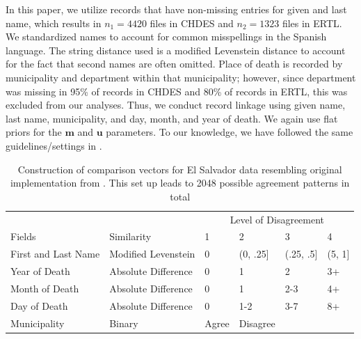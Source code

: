 \documentclass[12pt,letterpaper]{article}
\newcommand{\1}[1]{\mathbb{I}\!\left[#1\right]} %
\begin{document}
In this paper, we utilize records that have non-missing entries for given and last name, which results 
in \(n_1 = 4420\) files in CHDES and \(n_2 = 1323\) files
in ERTL. We standardized names to account for common misspellings
in the Spanish language. The string distance used is a modified Levenstein
distance to account for the fact that second names are often omitted.
Place of death is recorded by municipality and department within that
municipality; however, since department was missing in 95\% of records
in CHDES and 80\% of records in ERTL, this was excluded from our analyses. 
Thus, we conduct record linkage using given name, last name,
municipality, and day, month, and year of death. We again use flat
priors for the \(\mathbf{m}\) and \(\mathbf{u}\) parameters. To our knowledge, we have followed the same guidelines/settings in \cite{sadinle_bayesian_2017}.
\begin{table}
\begin{tabular}[h!]{ll|llll}
	\hline
	\multicolumn{2}{c|}{ } & \multicolumn{4}{c}{Level of Disagreement} \\
	\cline{3-6}
	Fields & Similarity & 1 & 2 & 3 & 4\\
	\hline
	First and Last Name & Modified Levenstein & 0 & (0, .25] & (.25, .5] & (5, 1]\\
	\hline
	Year of Death & Absolute Difference & 0 & 1 & 2 & 3+\\
	\hline
	Month of Death & Absolute Difference & 0 & 1 & 2-3 & 4+\\
	\hline
	Day of Death & Absolute Difference & 0 & 1-2 & 3-7 & 8+\\
	\hline
	Municipality & Binary & Agree & Disagree &  & \\
	\hline
\end{tabular}
\caption{Construction of comparison vectors for El Salvador data resembling original implementation from \citep{sadinle2018bayesian}. This set up leads to 2048 possible agreement patterns in total}\label{Tab:el_salvador_cutoffs_1}
\end{table}

\vspace{1em}
\end{document}
